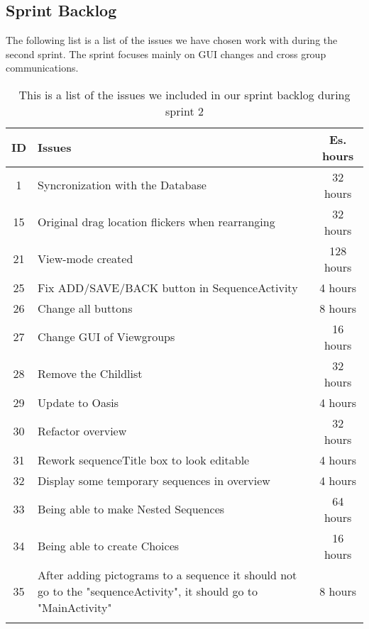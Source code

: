 \subsection{Sprint Backlog}\label{subsec:spr2_sprblog}
The following list is a list of the issues we have chosen work with during the second sprint. The sprint focuses mainly on GUI changes and cross group communications.
\begin{longtable} { | c | p{12cm} | c | } 
\hline
	ID 	&	Issues	&		 Es. hours \\\hline
	1	& 	Syncronization with the Database	&	32 hours	\\\hline
	15	& 	Original drag location flickers when rearranging	&	32 hours	\\\hline
	21	& 	View-mode created	&	128 hours	\\\hline	
	25	& 	Fix ADD/SAVE/BACK button in SequenceActivity	&	4 hours	\\\hline
	26	& 	Change all buttons	&	8 hours	\\\hline
	27	& 	Change GUI of Viewgroups	&	16 hours	\\\hline
	28	& 	Remove the Childlist	&	32 hours	\\\hline
	29	& 	Update to Oasis	&	4 hours	\\\hline
	30	& 	Refactor overview	&	32 hours	\\\hline
	31	& 	Rework sequenceTitle box to look editable	&	4 hours	\\\hline
	32	& 	Display some temporary sequences in overview	&	4 hours	\\\hline
	33 	&	Being able to make Nested Sequences	&	64 hours \\\hline
	34 	&	Being able to create Choices	&	16 hours \\\hline
	35  &   After adding pictograms to a sequence it should not go to the "sequenceActivity", it should go to "MainActivity" & 8 hours \\\hline
\caption{This is a list of the issues we included in our sprint backlog during sprint 2}
\label{tab:spr2_sprintblog}
\end{longtable}